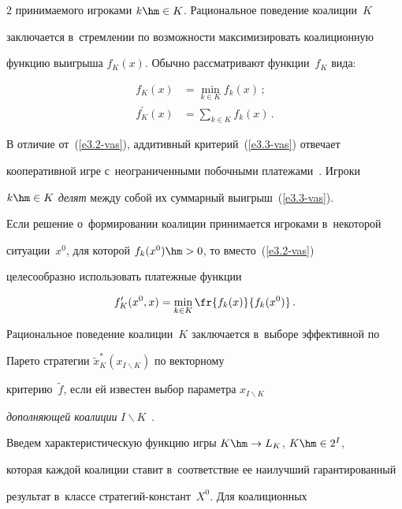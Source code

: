 \begin{multicols}{2}
принимаемого игроками $k\hm\in K$. Рациональное поведение коалиции~$K$

заключается в~стремлении по возможности максимизировать коалиционную

функцию выигрыша $f_K(x)$. Обычно рассматривают функции~$f_K$ вида:

\begin{align}

f_K(x)&= \min\limits_{k\in K} f_k(x)\,;\label{e3.2-vas}\\

f_K^\prime(x) &= \sum\limits_{k\in K} f_k(x)\,.\label{e3.3-vas}

\end{align}

В отличие от~(\ref{e3.2-vas}), аддитивный критерий~(\ref{e3.3-vas}) отвечает

кооперативной игре с~неограниченными побочными платежами~\cite{1-vas}. Игроки

$k\hm\in K$ \textit{делят} между собой их суммарный выигрыш~(\ref{e3.3-vas}).

Если решение о~формировании коалиции принимается игроками в~некоторой

ситуации~$x^0$, для которой $f_k(x^0) \hm> 0$, то вместо~(\ref{e3.2-vas})

целесообразно использовать платежные функции

\begin{equation}

f_K^\prime(x^0,x) =\min\limits_{k\in K} \fr{f_k(x)}{f_k(x^0)}\,.

\label{e3.2-1-vas}

\end{equation}

Рациональное поведение коалиции~$K$ заключается в~выборе эффективной по

Парето стратегии $\tilde{x}^*_K(x_{I\backslash K})$ по векторному

критерию~$\tilde{f}$, если ей из\-вес\-тен выбор параметра $ x_{I\backslash K}$

\textit{дополняющей коалиции} $I\backslash K$~\cite{14-vas, 17-vas}.



    Введем характеристическую функцию игры $K\hm\to L_K$, $K\hm\in 2^I$,

которая каждой коалиции ставит в~соответствие ее наилучший гарантированный

результат в~классе стра\-те\-гий-констант~$X^0$. Для коалиционных


\end{multicols}
